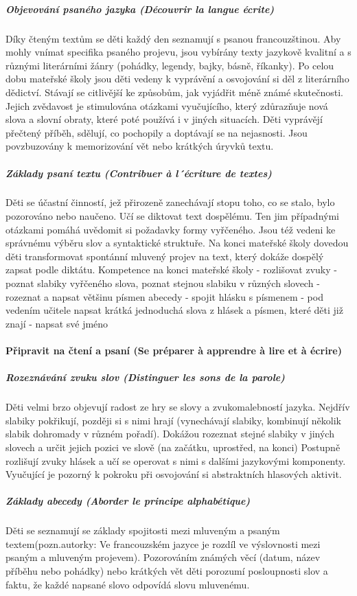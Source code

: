 			\subparagraph{Objevování psaného jazyka (Découvrir la langue écrite)}
			Díky čteným textům se děti každý den seznamují s psanou francouzštinou. Aby mohly vnímat specifika psaného projevu, jsou vybírány texty jazykově kvalitní a s různými literárními žánry (pohádky, legendy, bajky, básně, říkanky). Po celou dobu mateřské školy jsou děti vedeny k vyprávění a osvojování si děl z literárního dědictví. Stávají se citlivější ke způsobům, jak vyjádřit méně známé skutečnosti. Jejich zvědavost je stimulována otázkami vyučujícího, který zdůrazňuje nová slova a slovní obraty, které poté používá i v jiných situacích.  Děti vyprávějí přečtený příběh, sdělují, co pochopily a doptávají se na nejasnosti. Jsou povzbuzovány k memorizování vět nebo krátkých úryvků textu. 

		\subparagraph{Základy psaní textu (Contribuer à l´écriture de textes)}
			Děti se účastní činností, jež přirozeně zanechávají stopu toho, co se stalo, bylo pozorováno nebo naučeno. Učí se diktovat text dospělému. Ten jim případnými otázkami pomáhá uvědomit si požadavky formy vyřčeného. Jsou též vedeni ke správnému výběru slov a syntaktické struktuře. Na konci mateřské školy dovedou děti transformovat spontánní mluvený projev na text, který dokáže dospělý zapsat podle diktátu.
			Kompetence na konci mateřské školy
			- rozlišovat zvuky
			- poznat slabiky vyřčeného slova, poznat stejnou slabiku v různých slovech
			- rozeznat a napsat většinu písmen abecedy
			- spojit hlásku s písmenem
			- pod vedením učitele napsat krátká jednoduchá slova z hlásek a písmen, které děti již znají
			- napsat své jméno

		\paragraph{Připravit na čtení a psaní (Se préparer à apprendre à lire et à écrire)}
			\subparagraph{Rozeznávání zvuku slov (Distinguer les sons de la parole)}
			Děti velmi brzo objevují radost ze hry se slovy a zvukomalebností jazyka. Nejdřív slabiky pokřikují, později si s nimi hrají (vynechávají slabiky, kombinují několik slabik dohromady v různém pořadí). Dokážou rozeznat stejné slabiky v jiných slovech a určit jejich pozici ve slově (na začátku, uprostřed, na konci)
			Postupně rozlišují zvuky hlásek a učí se operovat s nimi s dalšími jazykovými komponenty. Vyučující je pozorný k pokroku při osvojování si abstraktních hlasových aktivit.

			\subparagraph{Základy abecedy (Aborder le principe alphabétique)}
			Děti se seznamují se základy spojitosti mezi mluveným a psaným textem(pozn.autorky: Ve francouzském jazyce je rozdíl ve výslovnosti mezi psaným a mluveným projevem). Pozorováním známých věcí (datum, název příběhu nebo pohádky) nebo krátkých vět děti porozumí posloupnosti slov a faktu, že každé napsané slovo odpovídá slovu mluvenému. 

